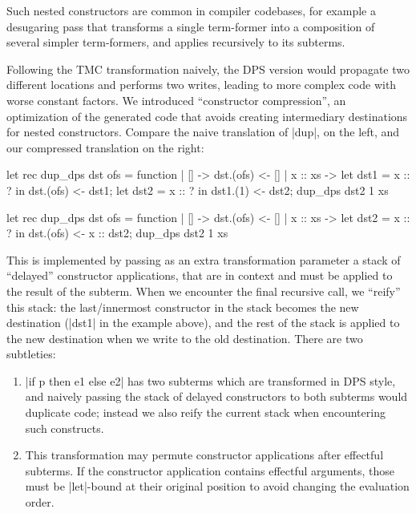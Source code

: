 Such nested constructors are common in compiler codebases, for
example a desugaring pass that transforms a single term-former into
a composition of several simpler term-formers, and applies recursively to
its subterms.

Following the TMC transformation naively, the DPS version would propagate two different locations and performs two writes, leading to more complex code with worse constant factors. We introduced ``constructor compression'', an optimization of the generated code that avoids creating intermediary destinations for nested constructors. Compare the naive translation of \ocaml|dup|, on the left, and our compressed translation on the right:

\begin{minipage}{0.5\linewidth}
\begin{Ocaml}
let rec dup_dps dst ofs = function
| [] -> dst.(ofs) <- []
| x :: xs ->
  let dst1 = x :: ? in
  dst.(ofs) <- dst1;
  let dst2 = x :: ? in
  dst1.(1) <- dst2;
  dup_dps dst2 1 xs
\end{Ocaml}
\end{minipage}
\hfill
\begin{minipage}{0.5\linewidth}
\begin{Ocaml}
let rec dup_dps dst ofs = function
| [] -> dst.(ofs) <- []
| x :: xs ->
  let dst2 = x :: ? in
  dst.(ofs) <- x :: dst2;
  dup_dps dst2 1 xs
\end{Ocaml}
\end{minipage}

This is implemented by passing as an extra transformation parameter a stack of ``delayed'' constructor applications, that are in context and must be applied to the result of the subterm. When we encounter the final recursive call, we ``reify'' this stack: the last/innermost constructor in the stack becomes the new destination (\ocaml|dst1| in the example above), and the rest of the stack is applied to the new destination when we write to the old destination. There are two subtleties:
\begin{enumerate}
\item \ocaml|if p then e1 else e2| has two subterms which are transformed in DPS style, and naively passing the stack of delayed constructors to both subterms would duplicate code; instead we also reify the current stack when encountering such constructs.
\item This transformation may permute constructor applications after effectful subterms. If the constructor application contains effectful arguments, those must be \ocaml|let|-bound at their original position to avoid changing the evaluation order.
\end{enumerate}

